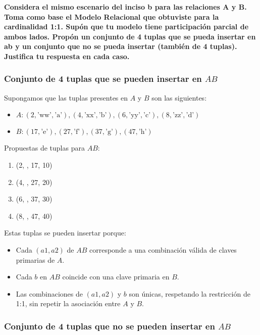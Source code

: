 \textbf{Considera el mismo escenario del inciso b para las relaciones A y B. Toma como base el Modelo Relacional que
obtuviste para la cardinalidad 1:1. Supón que tu modelo tiene participación parcial de ambos lados. Propón un
conjunto de 4 tuplas que se pueda insertar en ab y un conjunto que no se pueda insertar (también de 4 tuplas).
Justifica tu respuesta en cada caso.}\vspace{.3cm}
\subsubsection*{Conjunto de 4 tuplas que se pueden insertar en \( AB \)}

Supongamos que las tuplas presentes en \( A \) y \( B \) son las siguientes:

\begin{itemize}
    \item \( A: (2, \text{'ww'}, \text{'a'}), (4, \text{'xx'}, \text{'b'}), (6, \text{'yy'}, \text{'c'}), (8, \text{'zz'}, \text{'d'}) \)
    \item \( B: (17, \text{'e'}), (27, \text{'f'}), (37, \text{'g'}), (47, \text{'h'}) \)
\end{itemize}

Propuestas de tuplas para \( AB \):

\begin{enumerate}
    \item (2, , 17, 10)
    \item (4, , 27, 20)
    \item (6, , 37, 30)
    \item (8, , 47, 40)
\end{enumerate}


Estas tuplas se pueden insertar porque:

\begin{itemize}
    \item Cada \( (a1, a2) \) de \( AB \) corresponde a una combinación válida de claves primarias de \( A \).
    \item Cada \( b \) en \( AB \) coincide con una clave primaria en \( B \).
    \item Las combinaciones de \( (a1, a2) \) y \( b \) son únicas, respetando la restricción de 1:1, sin repetir la asociación entre \( A \) y \( B \).
\end{itemize}

\subsubsection*{Conjunto de 4 tuplas que no se pueden insertar en \( AB \)}

